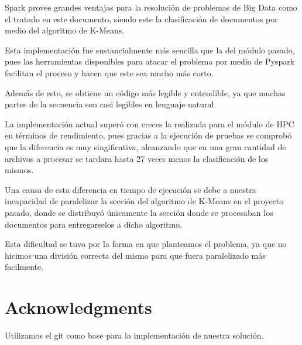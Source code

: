 \documentclass[fleqn,10pt]{SelfArx} %
\begin{document}
Spark provee grandes ventajas para la resolución de problemas de Big Data como el tratado en este documento, siendo este la clasificación de documentos por medio del algoritmo de K-Means.

\noindent Esta implementación fue sustancialmente más sencilla que la del módulo pasado, pues las herramientas disponibles para atacar el problema por medio de Pyspark facilitan el proceso y hacen que este sea mucho más corto.

\noindent Además de esto, se obtiene un código más legible y entendible, ya que muchas partes de la secuencia son casi legibles en lenguaje natural.

\noindent La implementación actual superó con creces la realizada para el módulo de HPC en términos de rendimiento, pues gracias a la ejecución de pruebas se comprobó que la diferencia es muy singificativa, alcanzando que en una gran cantidad de archivos a procesar se tardara hasta 27 veces menos la clasificación de los mismos.

\noindent Una causa de esta diferencia en tiempo de ejecución se debe a nuestra incapacidad de paralelizar la sección del algoritmo de K-Means en el proyecto pasado, donde se distribuyó únicamente la sección donde se procesaban los documentos para entregarselos a dicho algoritmo.

\noindent Esta dificultad se tuvo por la forma en que planteamos el problema, ya que no hicimos una división correcta del mismo para que fuera paralelizado más facilmente.



\section*{Acknowledgments} %
Utilizamos el git\cite{git} como base para la implementación de nuestra solución.





\end{document}

